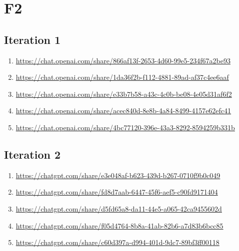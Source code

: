 \section{F2\label{F2-1}}

\subsection{Iteration 1}

\begin{enumerate}
    \item \href{https://chat.openai.com/share/866af13f-2653-4d60-99e5-234f67a2be93}{https://chat.openai.com/share/866af13f-2653-4d60-99e5-234f67a2be93}
    \item \href{https://chat.openai.com/share/1da36f2b-f112-4881-89ad-af37c4ee6aaf}{https://chat.openai.com/share/1da36f2b-f112-4881-89ad-af37c4ee6aaf}
    \item \href{https://chat.openai.com/share/e33b7b58-a43c-4c0b-be08-4e05d31af6f2}{https://chat.openai.com/share/e33b7b58-a43c-4c0b-be08-4e05d31af6f2}
    \item \href{https://chat.openai.com/share/acec840d-8e8b-4a84-8499-4157e62efc41}{https://chat.openai.com/share/acec840d-8e8b-4a84-8499-4157e62efc41}
    \item \href{https://chat.openai.com/share/4bc77120-396e-43a3-8292-8594259b331b}{https://chat.openai.com/share/4bc77120-396e-43a3-8292-8594259b331b}
\end{enumerate}

\subsection{Iteration 2}

\begin{enumerate}
    \item \href{https://chatgpt.com/share/e3e048af-b623-439d-b267-0710f9b0c049}{https://chatgpt.com/share/e3e048af-b623-439d-b267-0710f9b0c049}
    \item \href{https://chatgpt.com/share/fd8d7aab-6447-45f6-aef5-c90fd9171404}{https://chatgpt.com/share/fd8d7aab-6447-45f6-aef5-c90fd9171404}
    \item \href{https://chatgpt.com/share/d5fd65a8-da11-44e5-a065-42ca9455602d}{https://chatgpt.com/share/d5fd65a8-da11-44e5-a065-42ca9455602d}
    \item \href{https://chatgpt.com/share/f05d4764-8b8a-41ab-82b6-a7d83b6bcc85}{https://chatgpt.com/share/f05d4764-8b8a-41ab-82b6-a7d83b6bcc85}
    \item \href{https://chatgpt.com/share/c60d397a-d994-401d-9dc7-89bf3ff00118}{https://chatgpt.com/share/c60d397a-d994-401d-9dc7-89bf3ff00118}
\end{enumerate}

